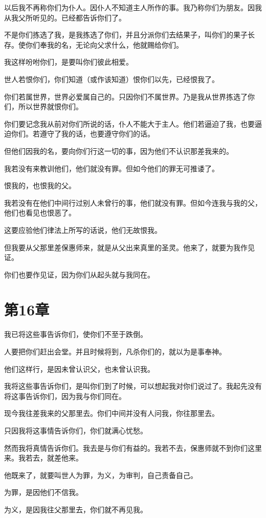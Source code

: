 \documentclass[12pt,oneside]{book}
\begin{document}
以后我不再称你们为仆人。因仆人不知道主人所作的事。我乃称你们为朋友。因我从我父所听见的。已经都告诉你们了。

不是你们拣选了我，是我拣选了你们，并且分派你们去结果子，叫你们的果子长存。使你们奉我的名，无论向父求什么，他就赐给你们。

我这样吩咐你们，是要叫你们彼此相爱。

世人若恨你们，你们知道（或作该知道）恨你们以先，已经恨我了。

你们若属世界，世界必爱属自己的。只因你们不属世界。乃是我从世界拣选了你们，所以世界就恨你们。

你们要记念我从前对你们所说的话，仆人不能大于主人。他们若逼迫了我，也要逼迫你们。若遵守了我的话，也要遵守你们的话。

但他们因我的名，要向你们行这一切的事，因为他们不认识那差我来的。

我若没有来教训他们，他们就没有罪。但如今他们的罪无可推诿了。

恨我的，也恨我的父。

我若没有在他们中间行过别人未曾行的事，他们就没有罪。但如今连我与我的父，他们也看见也恨恶了。

这要应验他们律法上所写的话说，他们无故恨我。

但我要从父那里差保惠师来，就是从父出来真里的圣灵。他来了，就要为我作见证。

你们也要作见证，因为你们从起头就与我同在。

\chapter{第16章}
我已将这些事告诉你们，使你们不至于跌倒。

人要把你们赶出会堂。并且时候将到，凡杀你们的，就以为是事奉神。

他们这样行，是因未曾认识父，也未曾认识我。

我将这些事告诉你们，是叫你们到了时候，可以想起我对你们说过了。我起先没有将这事告诉你们，因为我与你们同在。

现今我往差我来的父那里去。你们中间并没有人问我，你往那里去。

只因我将这事情告诉你们，你们就满心忧愁。

然而我将真情告诉你们。我去是与你们有益的。我若不去，保惠师就不到你们这里来。我若去，就差他来。

他既来了，就要叫世人为罪，为义，为审判，自己责备自己。

为罪，是因他们不信我。

为义，是因我往父那里去，你们就不再见我。
\end{document}
